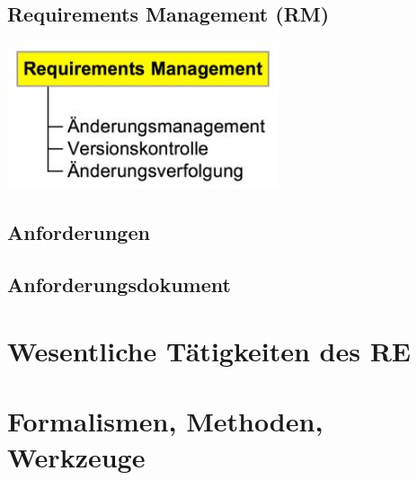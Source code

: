 \documentclass[a4paper,12pt]{article}
\begin{document}
	\subsection{Requirements Management (RM)}
	\begin{center}
		\includegraphics[width=8cm]{pics/rm.jpg}
	\end{center}
	\subsection{Anforderungen}
	
	\subsection{Anforderungsdokument}
	
	\section{Wesentliche Tätigkeiten des RE}
	
	\section{Formalismen, Methoden, Werkzeuge}
	
\end{document}
